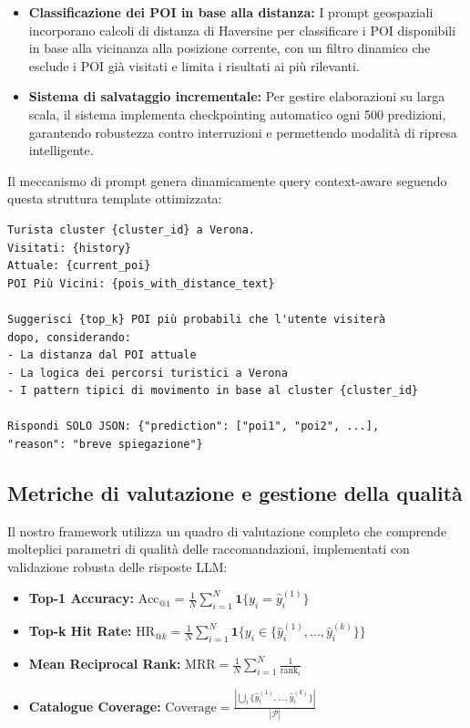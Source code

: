 \begin{itemize}
\begin{itemize}
\item \textbf{Classificazione dei POI in base alla distanza:} I prompt geospaziali incorporano calcoli di distanza di Haversine per classificare i POI disponibili in base alla vicinanza alla posizione corrente, con un filtro dinamico che esclude i POI già visitati e limita i risultati ai più rilevanti.

\item \textbf{Sistema di salvataggio incrementale:} Per gestire elaborazioni su larga scala, il sistema implementa checkpointing automatico ogni 500 predizioni, garantendo robustezza contro interruzioni e permettendo modalità di ripresa intelligente.
\end{itemize}

Il meccanismo di prompt genera dinamicamente query context-aware seguendo questa struttura template ottimizzata:

\begin{lstlisting}[language=text, caption=Template di Prompt Comprensivo]
Turista cluster {cluster_id} a Verona.
Visitati: {history}
Attuale: {current_poi}
POI Più Vicini: {pois_with_distance_text}

Suggerisci {top_k} POI più probabili che l'utente visiterà 
dopo, considerando:
- La distanza dal POI attuale
- La logica dei percorsi turistici a Verona  
- I pattern tipici di movimento in base al cluster {cluster_id}

Rispondi SOLO JSON: {"prediction": ["poi1", "poi2", ...], 
"reason": "breve spiegazione"}
\end{lstlisting}

\subsection{Metriche di valutazione e gestione della qualità}

Il nostro framework utilizza un quadro di valutazione completo che comprende molteplici parametri di qualità delle raccomandazioni, implementati con validazione robusta delle risposte LLM:

\begin{itemize}
\item \textbf{Top-1 Accuracy:} $\text{Acc}_{@1} = \frac{1}{N}\sum_{i=1}^{N}\mathbf{1}\{y_i = \hat{y}_i^{(1)}\}$
\item \textbf{Top-k Hit Rate:} $\text{HR}_{@k} = \frac{1}{N}\sum_{i=1}^{N}\mathbf{1}\{y_i \in \{\hat{y}_i^{(1)}, \ldots, \hat{y}_i^{(k)}\}\}$
\item \textbf{Mean Reciprocal Rank:} $\text{MRR} = \frac{1}{N}\sum_{i=1}^{N}\frac{1}{\text{rank}_i}$
\item \textbf{Catalogue Coverage:} $\text{Coverage} = \frac{|\bigcup_{i}\{\hat{y}_i^{(1)}, \ldots, \hat{y}_i^{(k)}\}|}{|\mathcal{P}|}$
\end{itemize}


\end{itemize}
